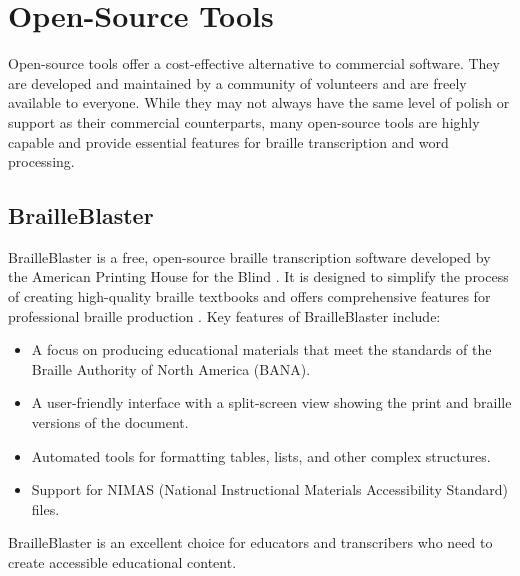 \section{Open-Source Tools}\label{ch12:sec:open-source-tools}
Open-source tools offer a cost-effective alternative to commercial software. They are developed and maintained by a community of volunteers and are freely available to everyone. While they may not always have the same level of polish or support as their commercial counterparts, many open-source tools are highly capable and provide essential features for braille transcription and word processing.

\subsection{BrailleBlaster}\label{ch12:ssec:brailleblaster}
BrailleBlaster is a free, open-source braille transcription software developed by the American Printing House for the Blind \supercite{BrailleBlaster, APHBrailleBlaster}. It is designed to simplify the process of creating high-quality braille textbooks and offers comprehensive features for professional braille production \supercite{APHBrailleBlasterFeatures}. Key features of BrailleBlaster include:
\begin{itemize}
	\item A focus on producing educational materials that meet the standards of the Braille Authority of North America (BANA).
	\item A user-friendly interface with a split-screen view showing the print and braille versions of the document.
	\item Automated tools for formatting tables, lists, and other complex structures.
	\item Support for NIMAS (National Instructional Materials Accessibility Standard) files.
\end{itemize}
BrailleBlaster is an excellent choice for educators and transcribers who need to create accessible educational content.

